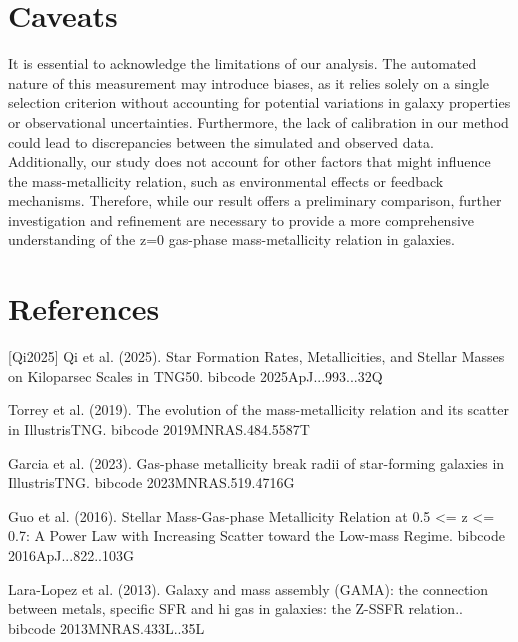\documentclass[twocolumn]{aastex631}
\begin{document}
\section{Caveats}
It is essential to acknowledge the limitations of our analysis. The automated nature of this measurement may introduce biases, as it relies solely on a single selection criterion without accounting for potential variations in galaxy properties or observational uncertainties. Furthermore, the lack of calibration in our method could lead to discrepancies between the simulated and observed data. Additionally, our study does not account for other factors that might influence the mass-metallicity relation, such as environmental effects or feedback mechanisms. Therefore, while our result offers a preliminary comparison, further investigation and refinement are necessary to provide a more comprehensive understanding of the z=0 gas-phase mass-metallicity relation in galaxies.
\section*{References}
\footnotesize
[Qi2025] Qi et al. (2025). Star Formation Rates, Metallicities, and Stellar Masses on Kiloparsec Scales in TNG50. bibcode 2025ApJ...993...32Q \par [Torrey2019] Torrey et al. (2019). The evolution of the mass-metallicity relation and its scatter in IllustrisTNG. bibcode 2019MNRAS.484.5587T \par [Garcia2023] Garcia et al. (2023). Gas-phase metallicity break radii of star-forming galaxies in IllustrisTNG. bibcode 2023MNRAS.519.4716G \par [Guo2016] Guo et al. (2016). Stellar Mass-Gas-phase Metallicity Relation at 0.5 <= z <= 0.7: A Power Law with Increasing Scatter toward the Low-mass Regime. bibcode 2016ApJ...822..103G \par [LaraLopez2013] Lara-Lopez et al. (2013). Galaxy and mass assembly (GAMA): the connection between metals, specific  SFR and hi gas in galaxies: the Z-SSFR relation.. bibcode 2013MNRAS.433L..35L
\end{document}
